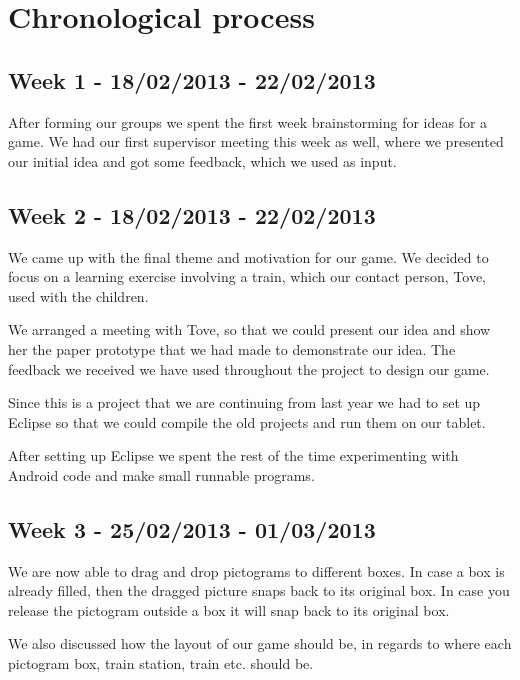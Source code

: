 \chapter{Chronological process}


\section*{Week 1 - 18/02/2013 - 22/02/2013}

After forming our groups we spent the first week brainstorming for ideas for a game. We had our first supervisor meeting this week as well, where we presented our initial idea and got some feedback, which we used as input. 

\section*{Week 2 - 18/02/2013 - 22/02/2013} 

We came up with the final theme and motivation for our game. We decided to focus on a learning exercise involving a train, which our contact person, Tove, used with the children. 

We arranged a meeting with Tove, so that we could present our idea and show her the paper prototype that we had made to demonstrate our idea. The feedback we received we have used throughout the project to design our game. 

Since this is a project that we are continuing from last year we had to set up Eclipse so that we could compile the old projects and run them on our tablet. 

After setting up Eclipse we spent the rest of the time experimenting with Android code and make small runnable programs. 

\section*{Week 3 - 25/02/2013 - 01/03/2013}

We are now able to drag and drop pictograms to different boxes. In case a box is already filled, then the dragged picture snaps back to its original box. In case you release the pictogram outside a box it will snap back to its original box. 

We also discussed how the layout of our game should be, in regards to where each pictogram box, train station, train etc. should be. 

